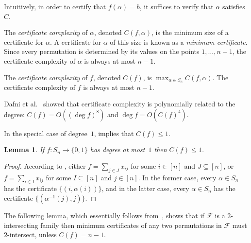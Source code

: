\documentclass[10pt,a4paper]{amsart}
\newtheorem{lemma}[theorem]{Lemma}
\theoremstyle{definition}
\begin{document}
Intuitively, in order to certify that $f(\alpha) = b$, it suffices to verify that $\alpha$ satisfies $C$. 

The \emph{certificate complexity} of $\alpha$, denoted $C(f,\alpha)$, is the minimum size of a certificate for $\alpha$. A certificate for $\alpha$ of this size is known as a \emph{minimum certificate}.
Since every permutation is determined by its values on the points $1,\ldots,n-1$, the certificate complexity of $\alpha$ is always at most $n-1$.

The \emph{certificate complexity} of $f$, denoted $C(f)$, is $\max_{\alpha \in S_n} C(f,\alpha)$. The certificate complexity of $f$ is always at most $n-1$.

Dafni et al.~\cite[Theorem 3.1]{DFLLV} showed that certificate complexity is polynomially related to the degree: $C(f) = O((\deg f)^8)$ and $\deg f = O(C(f)^4)$.

In the special case of degree~$1$,  implies that $C(f) \leq 1$.

\begin{lemma} \label{lem:degree1-cert-sym}
If $f\colon S_n \to \{0,1\}$ has degree at most~$1$ then $C(f) \leq 1$.
\end{lemma}
\begin{proof}
According to , either $f = \sum_{j \in J} x_{ij}$ for some $i \in [n]$ and $J \subseteq [n]$, or $f = \sum_{i \in I} x_{ij}$ for some $I \subseteq [n]$ and $j \in [n]$. In the former case, every $\alpha \in S_n$ has the certificate $\{(i,\alpha(i))\}$, and in the latter case, every $\alpha \in S_n$ has the certificate $\{(\alpha^{-1}(j),j)\}$.
\end{proof}

\medskip

The following lemma, which essentially follows from~\cite[Lemma 7.3]{DFLLV}, shows that if $\mathcal{F}$ is a $2$-intersecting family then minimum certificates of any two permutations in $\mathcal{F}$ must $2$-intersect, unless $C(f) = n-1$.
\end{document}
